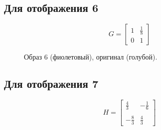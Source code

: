 \documentclass[a5paper, 10pt]{article}
\theoremstyle{definition}
\theoremstyle{plain}
\theoremstyle{remark}
\begin{document}
\newpage
\subsection{Для отображения 6}
\begin{equation}
G =
\begin{bmatrix}
1 & \frac{1}{8}\\
0 & 1
\end{bmatrix}
\end{equation}

\begin{figure}[h]
\caption{Образ 6 (фиолетовый), оригинал (голубой).}
\end{figure}

\newpage
\subsection{Для отображения 7}
\begin{equation}
H =
\begin{bmatrix}
\frac{4}{3} & - \frac{1}{6}\\
\\
- \frac{8}{3} &  \frac{4}{3}
\end{bmatrix}
\end{equation}
\end{document}
